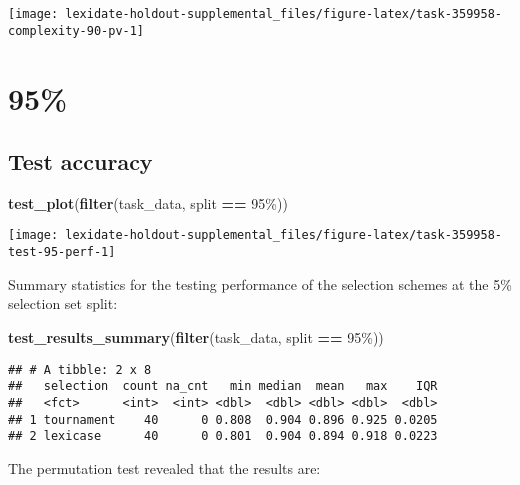 \documentclass[
]{book}
\newenvironment{Shaded}{\begin{snugshade}}{\end{snugshade}}
\newcommand{\FunctionTok}[1]{\textcolor[rgb]{0.13,0.29,0.53}{\textbf{#1}}}
\newcommand{\NormalTok}[1]{#1}
\newcommand{\SpecialCharTok}[1]{\textcolor[rgb]{0.81,0.36,0.00}{\textbf{#1}}}
\newcommand{\StringTok}[1]{\textcolor[rgb]{0.31,0.60,0.02}{#1}}
\begin{document}
\texttt{[image: lexidate-holdout-supplemental\_files/figure-latex/task-359958-complexity-90-pv-1]}

\hypertarget{section-34}{%
\section{95\%}\label{section-34}}

\hypertarget{test-accuracy-34}{%
\subsection{Test accuracy}\label{test-accuracy-34}}

\begin{Shaded}
\begin{Highlighting}[]
\FunctionTok{test\_plot}\NormalTok{(}\FunctionTok{filter}\NormalTok{(task\_data, split }\SpecialCharTok{==} \StringTok{\textquotesingle{}95\%\textquotesingle{}}\NormalTok{))}
\end{Highlighting}
\end{Shaded}

\texttt{[image: lexidate-holdout-supplemental\_files/figure-latex/task-359958-test-95-perf-1]}

Summary statistics for the testing performance of the selection schemes at the 5\% selection set split:

\begin{Shaded}
\begin{Highlighting}[]
\FunctionTok{test\_results\_summary}\NormalTok{(}\FunctionTok{filter}\NormalTok{(task\_data, split }\SpecialCharTok{==} \StringTok{\textquotesingle{}95\%\textquotesingle{}}\NormalTok{))}
\end{Highlighting}
\end{Shaded}

\begin{verbatim}
## # A tibble: 2 x 8
##   selection  count na_cnt   min median  mean   max    IQR
##   <fct>      <int>  <int> <dbl>  <dbl> <dbl> <dbl>  <dbl>
## 1 tournament    40      0 0.808  0.904 0.896 0.925 0.0205
## 2 lexicase      40      0 0.801  0.904 0.894 0.918 0.0223
\end{verbatim}

The permutation test revealed that the results are:
\end{document}
